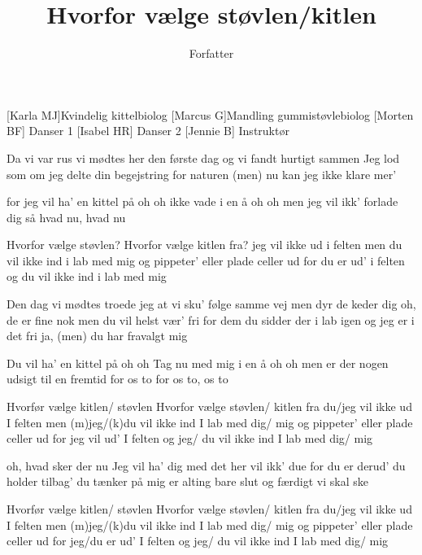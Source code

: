 \documentclass[a4paper,11pt]{article}
\title{Hvorfor vælge støvlen/kitlen}
\author{Forfatter}
\begin{document}
\maketitle

\begin{roles}
[Karla MJ]Kvindelig kittelbiolog
[Marcus G]Mandling gummistøvlebiolog
[Morten BF] Danser 1
[Isabel HR] Danser 2
[Jennie B] Instruktør
\end{roles}

\begin{song}
	 Da vi var rus
        vi mødtes her
        den første dag
	og vi fandt hurtigt sammen
	Jeg lod som om jeg delte din
	begejstring for naturen
	(men) nu kan jeg  ikke klare mer’

	for jeg vil ha’ en kittel på oh oh
	ikke vade i en å oh oh
	men jeg vil ikk’ forlade dig
	så hvad nu, hvad nu

	Hvorfor vælge støvlen?
	Hvorfor vælge kitlen fra?
        jeg vil ikke ud i felten men du
	vil ikke ind i lab med mig
        og pippeter’
	eller plade celler ud for du er
        ud’ i felten og du
	vil ikke ind i lab med mig

	 Den dag vi mødtes troede jeg
	at vi sku’ følge samme vej
        men dyr de keder dig
         oh, de er fine nok
	 men du vil helst vær’ fri for dem
	du sidder der i lab igen
	og jeg er i det fri
	 ja, (men) du har fravalgt mig

	Du vil ha’ en kittel på oh oh
	Tag nu med mig i en å oh oh 
	 men er der nogen udsigt til
        en fremtid for os to
	for os to, os to

	 Hvorfør vælge kitlen/ støvlen
	Hvorfor vælge  støvlen/ kitlen fra
	du/jeg vil ikke ud I felten men (m)jeg/(k)du
	vil ikke ind I lab med  dig/ mig
         og pippeter’
	eller plade celler ud for jeg vil
         ud’ I felten og  jeg/ du
	vil ikke ind I lab med  dig/ mig

	 oh, hvad sker der nu
         Jeg vil ha’ dig med
	 det her vil ikk’ due
	for du er derud’
	 du holder tilbag’
	 du tænker på mig
	 er alting bare slut og færdigt
         vi skal ske

	 Hvorfør vælge kitlen/ støvlen
	Hvorfor vælge  støvlen/ kitlen fra
 	du/jeg vil ikke ud I felten men (m)jeg/(k)du
	vil ikke ind I lab med  dig/ mig
        og pippeter’
	eller plade celler ud for jeg/du er
        ud’ I felten og  jeg/ du
	vil ikke ind I lab med  dig/ mig


\end{song}
\end{document}
